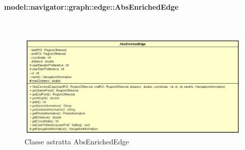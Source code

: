 \documentclass[../DefinizioneDiProdotto.tex]{subfiles}
\begin{document}
\paragraph{model::navigator::graph::edge::AbsEnrichedEdge}
\
\begin{figure}[H]
	\centering
	\includegraphics[width=\maxwidth]{img/AbsEnrichedEdge.png}
	\caption{Classe astratta AbsEnrichedEdge}\label{fig:model::navigator::graph::edge::AbsEnrichedEdge} 
\end{figure}
\end{document}
